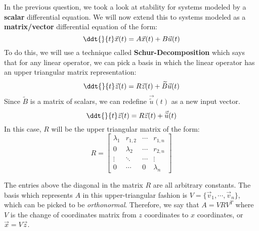

In the previous question, we took a look at stability for systems modeled by a \textbf{scalar} differential equation. 
We will now extend this to systems modeled as a \textbf{matrix/vector} differential equation of the form:
\begin{equation}\label{eqn:std}
  \ddt{}{t} \vec{x}(t) = A \vec{x}(t) + B \vec{u}(t)
\end{equation}
To do this, we will use a technique called \textbf{Schur-Decomposition} which says that for any linear operator, we can pick a basis in which the linear operator has an upper triangular matrix representation:
\begin{equation}\label{eqn:schur}
  \ddt{}{t} \vec{z}(t) = R \vec{z}(t) + \widetilde{B} \vec{u}(t)
\end{equation}
Since $\widetilde{B}$ is a matrix of scalars, we can redefine $\vec{\widetilde{{u}}}(t)$ as a new input vector.
\begin{equation}\label{eqn:input}
  \ddt{}{t} \vec{z}(t) = R \vec{z}(t) + \vec{\widetilde{{u}}}(t)
\end{equation}
In this case, $R$ will be the upper triangular matrix of the form: $$R = \begin{bmatrix} 
      \lambda_{1} & r_{1,2} & \cdots & r_{1,n} \\ 
      0 & \lambda_{2} & \cdots & r_{2,n} \\ 
      \vdots & \ddots & \cdots & \vdots \\
      0 & \cdots & 0 & \lambda_{n}
      \end{bmatrix}$$

The entries above the diagonal in the matrix $R$ are all arbitrary constants. The basis which represents $A$ in this upper-triangular fashion is $V = \{ \vec{v}_{1}, \cdots, \vec{v}_{n} \}$, which can be picked to be \textit{orthonormal}. Therefore, we say that $A = VRV^{T}$ where $V$ is the change of coordinates matrix from $z$ coordinates to $x$ coordinates, or $\vec{x} = V \vec{z}$.

